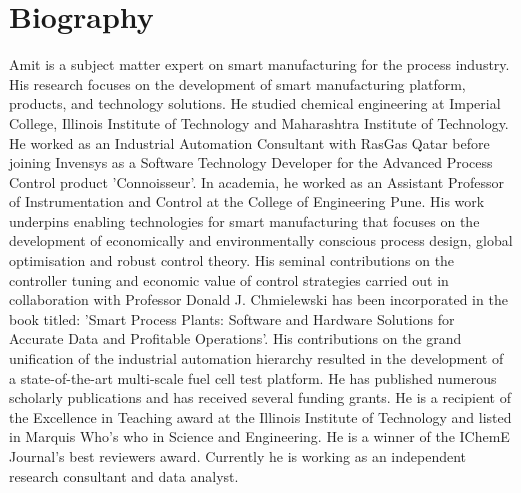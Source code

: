 \documentclass[10pt]{article}
\begin{document}
\section*{Biography}
Amit is a subject matter expert on smart manufacturing for the process industry. His research focuses on the development of smart manufacturing platform, products, and technology solutions. He studied chemical engineering at Imperial College, Illinois Institute of Technology and Maharashtra Institute of Technology. He worked as an Industrial Automation Consultant with RasGas Qatar before joining Invensys as a Software Technology Developer for the Advanced Process Control product 'Connoisseur{\texttrademark}’. In academia, he worked as an Assistant Professor of Instrumentation and Control at the College of Engineering Pune. His work underpins enabling technologies for smart manufacturing that focuses on the development of economically and environmentally conscious process design, global optimisation and robust control theory. His seminal contributions on the controller tuning and economic value of control strategies carried out in collaboration with Professor Donald J. Chmielewski has been incorporated in the book titled: 'Smart Process Plants: Software and Hardware Solutions for Accurate Data and Profitable Operations’. His contributions on the grand unification of the industrial automation hierarchy resulted in the development of a state-of-the-art multi-scale fuel cell test platform. He has published numerous scholarly publications and has received several funding grants. He is a recipient of the Excellence in Teaching award at the Illinois Institute of Technology and listed in Marquis Who's who in Science and Engineering. He is a winner of the IChemE Journal's best reviewers award. Currently he is working as an independent research consultant and data analyst.
\label{LastPage}
\end{document}
